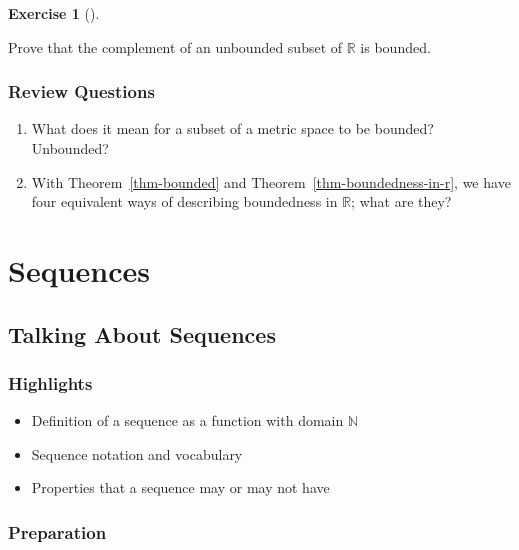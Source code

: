 \documentclass[
  letterpaper,
  DIV=11,
  numbers=noendperiod]{scrreprt}
\providecommand{\tightlist}{%
  \setlength{\itemsep}{0pt}\setlength{\parskip}{0pt}}
\def\R{\mathbb R}
\def\N{\mathbb N}
\theoremstyle{plain}
\theoremstyle{definition}
\newtheorem{exercise}{Exercise}[chapter]
\theoremstyle{plain}
\theoremstyle{plain}
\theoremstyle{definition}
\theoremstyle{definition}
\theoremstyle{remark}
\begin{document}
\begin{exercise}[]\protect\hypertarget{exr-unbounded-subset-of-r}{}\label{exr-unbounded-subset-of-r}

Prove that the complement of an unbounded subset of \(\R\) is bounded.

\end{exercise}

\section*{Review Questions}\label{review-questions-7}


\begin{enumerate}
\def\labelenumi{\arabic{enumi}.}
\tightlist
\item
  What does it mean for a subset of a metric space to be bounded?
  Unbounded?
\item
  With Theorem~\ref{thm-bounded} and Theorem~\ref{thm-boundedness-in-r},
  we have four equivalent ways of describing boundedness in \(\R\); what
  are they?
\end{enumerate}

\part{Sequences}

\chapter{Talking About Sequences}\label{sec-sequences}

\section*{Highlights}\label{highlights-8}


\begin{itemize}
\tightlist
\item
  Definition of a sequence as a function with domain \(\N\)
\item
  Sequence notation and vocabulary
\item
  Properties that a sequence may or may not have
\end{itemize}

\section{Preparation}\label{preparation-8}
\end{document}

